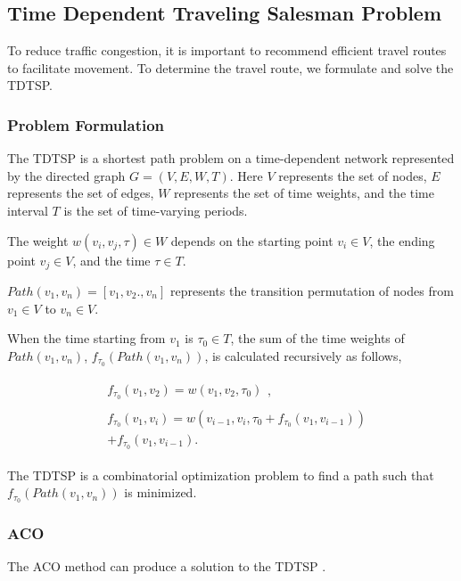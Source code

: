\documentclass[conference]{IEEEtran}
\begin{document}
\subsection{Time Dependent Traveling Salesman Problem}
\par To reduce traffic congestion, it is important to recommend efficient travel routes to facilitate movement.
To determine the travel route, we formulate and solve the TDTSP.

\subsubsection{Problem Formulation}
\par The TDTSP is a shortest path problem on a time-dependent network represented by the directed graph $G = (V, E, W, T)$.
Here $V$ represents the set of nodes, $E$ represents the set of edges, $W$ represents the set of time weights, and the time interval $T$ is the set of time-varying periods.
\par The weight $w(v_i, v_j, \tau) \in W$ depends on the starting point $v_i \in V$, the ending point $v_j \in V$, and the time $\tau \in T$.
\par $Path(v_1, v_n) = [v_1, v_2 . , v_n]$ represents the transition permutation of nodes from $v_1 \in V$ to $v_n \in V$.
\par When the time starting from $v_1$ is $\tau_0 \in T$, the sum of the time weights of $Path(v_1, v_n)$, $f_{\tau_0}(Path(v_1, v_n))$, is calculated recursively as follows,

\begin{align} 
& \begin{array}{c} f_{\tau_0}(v_1,v_2) = w(v_1,v_2,\tau_0) \end{array},\\
& \begin{array}{c} f_{\tau_0}(v_1,v_i) = w(v_{i-1},v_i,\tau_0 + f_{\tau_0}(v_1,v_{i-1})) \\ + f_{\tau_0}(v_1,v_{i-1}) . \end{array}
\end{align}

\par The TDTSP is a combinatorial optimization problem to find a path such that $f_{\tau_0}(Path(v_1, v_n))$ is minimized.

\subsubsection{ACO}
\par The ACO method \cite{dorigo2006ant} can produce a solution to the TDTSP \cite{yongqiang2010improved}\cite{fa2019improved}\cite{mavrovouniotis2017pheromone}\cite{mavrovouniotis2016ant}.
\end{document}
